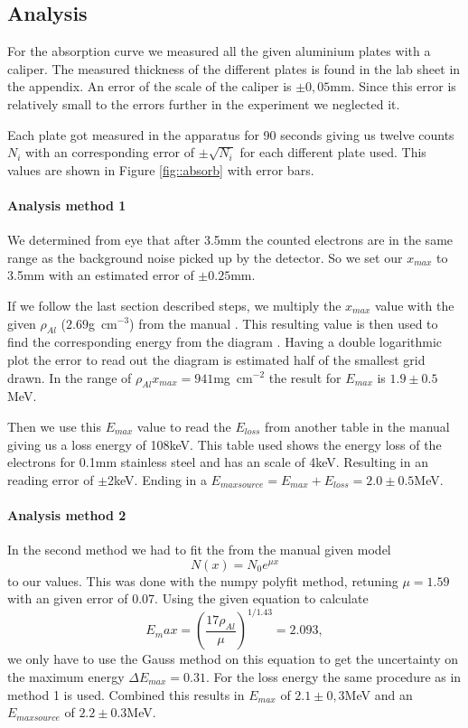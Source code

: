 \subsection{Analysis}
For the absorption curve we measured all the given aluminium plates with a caliper. 
The measured thickness of the different plates is found in the lab sheet in the appendix. 
An error of the scale of the caliper is $\pm0,05$\si{\mm}. 
Since this error is relatively small to the errors further in the experiment we neglected it.

Each plate got measured in the apparatus for 90 seconds giving us twelve counts $N_i$ with an corresponding error of $\pm\sqrt{N_i}$ for each different plate used.
This values are shown in Figure \ref{fig::absorb} with error bars.





\paragraph{Analysis method 1}
We determined from eye that after 3.5\si{\mm} the counted electrons are in the same range as the background noise picked up by the detector.
So we set our $x_{max}$ to 3.5mm with an estimated error of $\pm 0.25$\si{\mm}.


If we follow the last section described steps, we multiply the $x_{max}$ value with the given $\rho_{Al}$ ($2.69$\si{\g\centi\m}$^{-3}$) from the manual \cite{manual}.
This resulting value is then used to find the corresponding energy from the diagram \cite{manual}. 
Having a double logarithmic plot the error to read out the diagram is estimated half of the smallest grid drawn. 
In the range of $\rho_{Al} x_{max}= 941$\si{\mg\centi\m}$^{-2}$ the result for $E_{max}$ is $1.9 \pm 0.5$\si{\mega\electronvolt}.


Then we use this $E_{max}$ value to read the $E_{loss}$ from another table in the manual \cite{manual} giving us a loss energy of 108\si{\kilo\electronvolt}. 
This table used shows the energy loss of the electrons for 0.1mm stainless steel and has an scale of 4\si{\kilo\electronvolt}. 
Resulting in an reading error of $\pm$2\si{\kilo\electronvolt}. 
Ending in a $E_{maxsource}= E_{max}+E_{loss}= 2.0\pm0.5$\si{\mega\electronvolt}.
 


\paragraph{Analysis method 2}
In the second method we had to fit the from the manual \cite{manual} given model
\[
N(x)=N_0 e^{\mu x}
\]
to our values. 
This was done with the numpy polyfit method, retuning $\mu = 1.59$ with an given error of 0.07.
Using the given equation \cite{manual} to calculate 
\[
 E_max = \left(\frac{17\rho_{Al}}{\mu}\right)^{1/1.43} = 2.093,
\]
we only have to use the Gauss method on this equation to get the uncertainty on the maximum energy $\Delta E_{max} = 0.31$.
For the loss energy the same procedure as in method 1 is used.
Combined this results in  $E_{max}$ of $2.1 \pm 0,3$\si{\mega\electronvolt} and an $E_{maxsource}$ of  $2.2 \pm 0.3$\si{\mega\electronvolt}.




